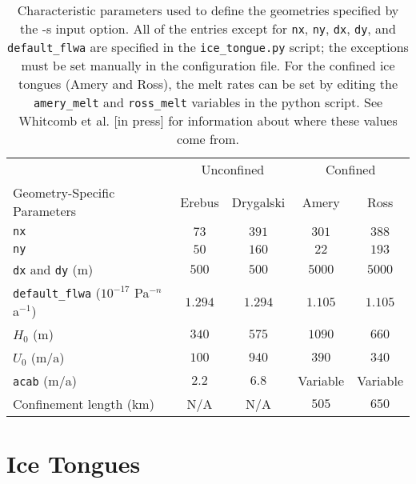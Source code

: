 \documentclass{article}
\begin{document}
\begin{table}
   \centering
   \begin{tabular}{l c c c c}
      \toprule
       & \multicolumn{2}{c}{Unconfined} & \multicolumn{2}{c}{Confined} \\
      \cmidrule(lr){2-3}
      \cmidrule(lr){4-5}
      Geometry-Specific Parameters & Erebus & Drygalski & Amery & Ross \\
      \cmidrule(lr){1-1}
      \cmidrule(lr){2-2}
      \cmidrule(lr){3-3}
      \cmidrule(lr){4-4}
      \cmidrule(lr){5-5}
      \texttt{nx} & $73$ & $391$ & $301$ & $388$ \\
      \texttt{ny} & $50$ & $160$ & $22$ & $193$ \\
      \texttt{dx} and \texttt{dy} (m) & $500$ & $500$ & $5000$ & $5000$ \\
      \texttt{default\_flwa} ($10^{-17}$ Pa$^{-n}$ a$^{-1}$) & $1.294$ & $1.294$ & $1.105$ & $1.105$ \\
      $H_0$ (m) & $340$ & $575$ & $1090$ & $660$ \\
      $U_0$ (m/a) & $100$ & $940$ & $390$ & $340$ \\
      \texttt{acab} (m/a) & $2.2$ & $6.8$ & Variable & Variable \\
      Confinement length (km) & N/A & N/A & $505$ & $650$ \\
      \bottomrule
   \end{tabular}
   \caption{Characteristic parameters used to define the geometries specified by the -s input option. All of the entries except for \texttt{nx}, \texttt{ny}, \texttt{dx}, \texttt{dy}, and \texttt{default\_flwa} are specified in the \texttt{ice\_tongue.py} script; the exceptions must be set manually in the configuration file. For the confined ice tongues (Amery and Ross), the melt rates can be set by editing the \texttt{amery\_melt} and \texttt{ross\_melt} variables in the python script. See Whitcomb et al. [in press] for information about where these values come from. }
   \label{table:geometries}
\end{table}

\section{Ice Tongues}
\end{document}
